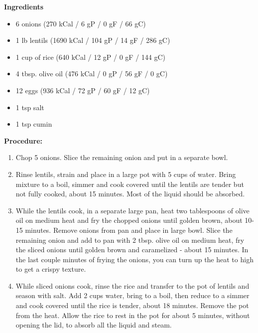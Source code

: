 \begin{multicols}{2}
\textbf{Ingredients}
\begin{itemize}


\item 6  onions \quad (270 kCal / 6 gP / 0 gF / 66 gC)
\item 1 lb lentils \quad (1690 kCal / 104 gP / 14 gF / 286 gC)
\item 1 cup of rice \quad (640 kCal / 12 gP / 0 gF / 144 gC)
\item 4 tbsp. olive oil \quad (476 kCal / 0 gP / 56 gF / 0 gC)
\item 12 eggs \quad (936 kCal / 72 gP / 60 gF / 12 gC)
\item 1 tsp salt 
\item 1 tsp cumin 



\end{itemize}


\columnbreak
\textbf{Procedure:}
\medskip


\begin{enumerate}
\item Chop 5 onions. Slice the remaining onion and put in a separate bowl. 
\medskip 
\item Rinse lentils, strain and place in a large pot with 5 cups of water. Bring mixture to a boil, simmer and cook covered until the lentils are tender but not fully cooked, about 15 minutes. Most of the liquid should be absorbed.
\medskip \item While the lentils cook, in a separate large pan, heat two tablespoons of olive oil on medium heat and fry the chopped onions until golden brown, about 10-15 minutes. Remove onions from pan and place in large bowl. Slice the remaining onion and add to pan with 2 tbsp. olive oil on medium heat, fry the sliced onions until golden brown and caramelized - about 15 minutes. In the last couple minutes of frying the onions, you can turn up the heat to high to get a crispy texture.


\item While sliced onions cook, rinse the rice and transfer to the pot of lentils and season with salt. Add 2 cups water, bring to a boil, then reduce to a simmer and cook covered until the rice is tender, about 18 minutes. Remove the pot from the heat. Allow the rice to rest in the pot for about 5 minutes, without opening the lid, to absorb all the liquid and steam.


\end{enumerate}
\end{multicols}
